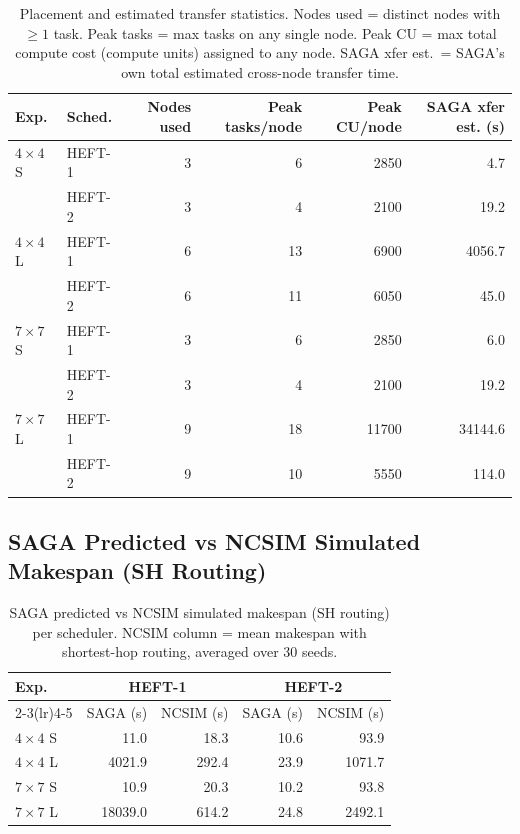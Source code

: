 \documentclass[11pt]{article}
\begin{document}
\begin{table}[H]
\centering
\small
\setlength{\tabcolsep}{4pt}
\begin{tabular}{l l r r r r}
\toprule
\textbf{Exp.} & \textbf{Sched.}
  & \textbf{Nodes used} & \textbf{Peak tasks/node}
  & \textbf{Peak CU/node} & \textbf{SAGA xfer est. (s)} \\
\midrule
  $4\times4$ S & HEFT-1 & 3 & 6 & 2850 & 4.7 \\
   & HEFT-2 & 3 & 4 & 2100 & 19.2 \\
  \midrule
  $4\times4$ L & HEFT-1 & 6 & 13 & 6900 & 4056.7 \\
   & HEFT-2 & 6 & 11 & 6050 & 45.0 \\
  \midrule
  $7\times7$ S & HEFT-1 & 3 & 6 & 2850 & 6.0 \\
   & HEFT-2 & 3 & 4 & 2100 & 19.2 \\
  \midrule
  $7\times7$ L & HEFT-1 & 9 & 18 & 11700 & 34144.6 \\
   & HEFT-2 & 9 & 10 & 5550 & 114.0 \\
  \bottomrule
\end{tabular}
\caption{Placement and estimated transfer statistics.
Nodes used = distinct nodes with $\geq 1$ task.
Peak tasks = max tasks on any single node.
Peak CU = max total compute cost (compute units) assigned to any node.
SAGA xfer est.\ = SAGA's own total estimated cross-node transfer time.}
\end{table}

\subsection{SAGA Predicted vs NCSIM Simulated Makespan (SH Routing)}

\begin{table}[H]
\centering
\small
\setlength{\tabcolsep}{4pt}
\begin{tabular}{l r r r r}
\toprule
\textbf{Exp.}
  & \multicolumn{2}{c}{\textbf{HEFT-1}}
  & \multicolumn{2}{c}{\textbf{HEFT-2}} \\
\cmidrule(lr){2-3}\cmidrule(lr){4-5}
  & SAGA (s) & NCSIM (s) & SAGA (s) & NCSIM (s) \\
\midrule
  $4\times4$ S & 11.0 & 18.3 & 10.6 & 93.9 \\
  $4\times4$ L & 4021.9 & 292.4 & 23.9 & 1071.7 \\
  $7\times7$ S & 10.9 & 20.3 & 10.2 & 93.8 \\
  $7\times7$ L & 18039.0 & 614.2 & 24.8 & 2492.1 \\
\bottomrule
\end{tabular}
\caption{SAGA predicted vs NCSIM simulated makespan (SH routing) per scheduler.
NCSIM column = mean makespan with shortest-hop routing, averaged over 30 seeds.}
\end{table}
\end{document}
